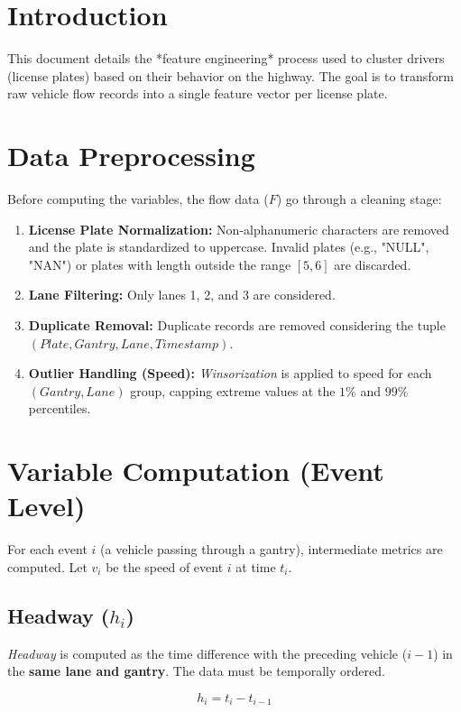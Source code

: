 \section{Introduction}
This document details the *feature engineering* process used to cluster drivers (license plates) based on their behavior on the highway. The goal is to transform raw vehicle flow records into a single feature vector per license plate.

\section{Data Preprocessing}
Before computing the variables, the flow data ($F$) go through a cleaning stage:

\begin{enumerate}
    \item \textbf{License Plate Normalization:} Non-alphanumeric characters are removed and the plate is standardized to uppercase. Invalid plates (e.g., "NULL", "NAN") or plates with length outside the range $[5, 6]$ are discarded.
    \item \textbf{Lane Filtering:} Only lanes 1, 2, and 3 are considered.
    \item \textbf{Duplicate Removal:} Duplicate records are removed considering the tuple $(Plate, Gantry, Lane, Timestamp)$.
    \item \textbf{Outlier Handling (Speed):} \textit{Winsorization} is applied to speed for each $(Gantry, Lane)$ group, capping extreme values at the $1\%$ and $99\%$ percentiles.
\end{enumerate}

\section{Variable Computation (Event Level)}
For each event $i$ (a vehicle passing through a gantry), intermediate metrics are computed. Let $v_i$ be the speed of event $i$ at time $t_i$.

\subsection{Headway ($h_i$)}
\textit{Headway} is computed as the time difference with the preceding vehicle ($i-1$) in the \textbf{same lane and gantry}. The data must be temporally ordered.

\begin{equation}
    h_i = t_i - t_{i-1}
\end{equation}

